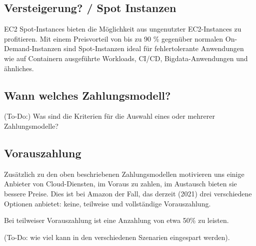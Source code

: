 
\subsection{Versteigerung? / Spot Instanzen }
EC2 Spot-Instances bieten die Möglichkeit aus ungenutzter EC2-Instances zu profitieren. 
Mit einem Preisvorteil von bis zu 90 \% gegenüber normalen On-Demand-Instanzen sind Spot-Instanzen ideal für fehlertolerante Anwendungen wie auf Containern ausgeführte Workloads, CI/CD, Bigdata-Anwendungen und ähnliches.
\subsection{Wann welches Zahlungsmodell?}
(To-Do:) Was sind die Kriterien für die Auswahl eines oder mehrerer Zahlungsmodelle?



\subsection{Vorauszahlung}
Zusätzlich zu den oben beschriebenen Zahlungsmodellen motivieren uns einige Anbieter von Cloud-Diensten, im Voraus zu zahlen, im Austausch bieten sie bessere Preise. Dies ist bei Amazon der Fall, das derzeit (2021) drei verschiedene Optionen anbietet: keine, teilweise und vollständige Vorauszahlung.

Bei teilweiser Vorauszahlung ist eine Anzahlung von etwa 50\% zu leisten.

(To-Do: wie viel kann in den verschiedenen Szenarien eingespart werden). 